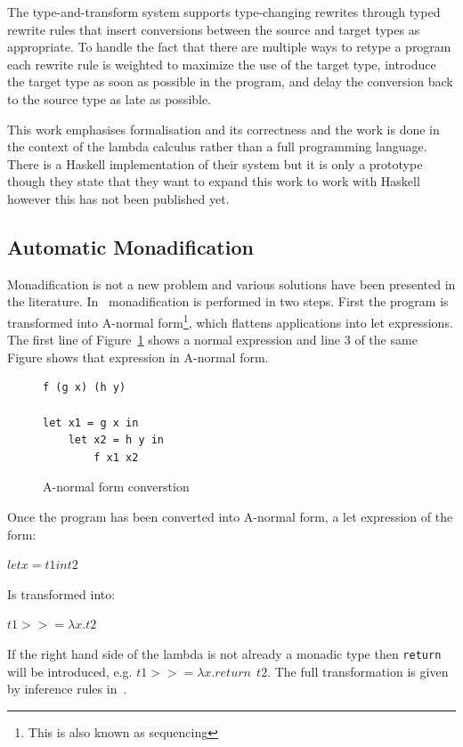 The type-and-transform system supports type-changing rewrites through typed rewrite rules that insert conversions between the source and target types as appropriate. To handle the fact that there are multiple ways to retype a program each rewrite rule is weighted to maximize the use of the target type, introduce the target type as soon as possible in the program, and delay the conversion back to the source type as late as possible.

This work emphasises formalisation and its correctness and the work is done in the context of the lambda calculus rather than a full programming language. There is a Haskell implementation of their system but it is only a prototype though they state that they want to expand this work to work with Haskell however this has not been published yet.

\subsection{Automatic Monadification}\label{erwigMonad}

Monadification is not a new problem and various solutions have been presented in the literature. In~\citep{lammelReuse} monadification is performed in two steps. First the program is transformed into A-normal form\footnote{This is also known as sequencing}, which flattens applications into let expressions. The first line of Figure~\ref{anormal} shows a normal expression and line 3 of the same Figure shows that expression in A-normal form.

\begin{figure}[t]
\begin{lstlisting}
f (g x) (h y)

let x1 = g x in
	let x2 = h y in
		f x1 x2
\end{lstlisting}
\caption{A-normal form converstion}
\label{anormal}
\end{figure}

Once the program has been converted into A-normal form, a let expression of the form: 

$ let x = t1 in t2 $ 

Is transformed into:

$ t1 >>= \lambda x. t2 $

If the right hand side of the lambda is not already a monadic type then \texttt{return} will be introduced, e.g. $ t1 >>= \lambda x. return~~t2 $. The full transformation is given by inference rules in~\citep{lammelReuse}.

